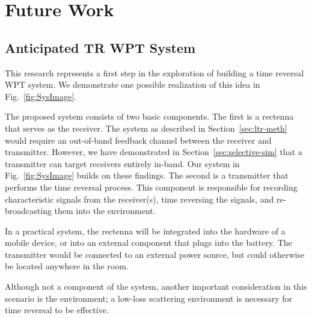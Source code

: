 \chapter{Future Work}
\label{ch:future}


\section{Anticipated TR WPT System}
\label{sec:future-roadmap}

This research represents a first step in the exploration of building a
time reversal WPT system.
%
We demonstrate one possible realization of this idea in Fig.~\ref{fig:SysImage}.


The proposed system consists of two basic components.
%
The first is a rectenna that serves as the receiver.
%
The system as described in Section~\ref{sec:ltr-meth} would require an
out-of-band feedback channel between the receiver and transmitter. However, we
have demonstrated in Section~\ref{sec:selective-sim} that a transmitter can target
receivers entirely in-band.
%
Our system in Fig.~\ref{fig:SysImage} builds on these findings.
%
The second is a transmitter that performs the time reversal process.
%
This component is responsible for recording characteristic signals from the
receiver(s), time reversing the signals, and re-broadcasting them into the
environment.



In a practical system, the rectenna will be integrated into the hardware of a
mobile device, or into an external component that plugs into the battery.
%
The transmitter would  be connected to an external power source, but
could otherwise be located anywhere in the room.

Although not a component of the system, another important consideration in this
scenario is the environment; a low-loss scattering environment is necessary for
time reversal to be effective.

